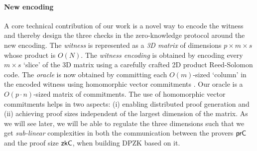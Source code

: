 \paragraph{New encoding} A core technical contribution of our work is a novel way to encode the witness and thereby design the three checks in the zero-knowledge protocol around the new encoding. The \textit{witness} is represented as a \textit{3D matrix} of dimensions $p \times m \times s$ whose product is $O(N)$. The \textit{witness encoding} is obtained by encoding every $m \times s$ `slice' of the 3D matrix using a carefully crafted 2D product Reed-Solomon code. %
The \textit{oracle} is now obtained by committing each $O(m)$-sized `column' in the encoded witness using homomorphic vector commitments \cite{Ped92}. 
Our oracle is a $O(p \cdot n)$-sized matrix of commitments. The use of homomorphic vector commitments helps in two aspects: (i) enabling distributed proof generation and (ii) achieving proof sizes independent of the largest dimension of the matrix.
As we will see later, we will be able to regulate the three dimensions such that we get \textit{sub-linear} complexities in both the communication between the provers $\mathsf{prC}$ and the proof size $\mathsf{zkC}$, when building DPZK based on it. 
